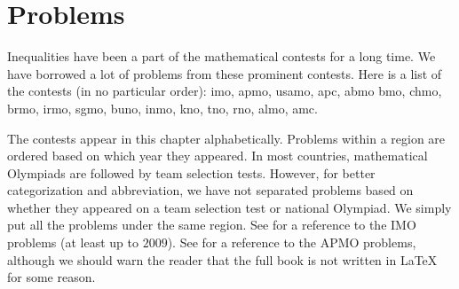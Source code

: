 \documentclass{subfile}
\begin{document}
	\chapter{Problems}\label{ch:problems}
	Inequalities have been a part of the mathematical contests for a long time. We have borrowed a lot of problems from these prominent contests. Here is a list of the contests (in no particular order): \Gls{imo}, \Gls{apmo}, \Gls{usamo}, \Gls{apc}, \Gls{abmo} \Gls{bmo}, \Gls{chmo}, \Gls{brmo}, \Gls{irmo}, \Gls{sgmo}, \Gls{buno}, \Gls{inmo}, \Gls{kno}, \Gls{tno}, \Gls{rno}, \Gls{almo}, \Gls{amc}.
	
	The contests appear in this chapter alphabetically. Problems within a region are ordered based on which year they appeared. In most countries, mathematical Olympiads are followed by team selection tests. However, for better categorization and abbreviation, we have not separated problems based on whether they appeared on a team selection test or national Olympiad. We simply put all the problems under the same region. See \textcite{djukicc_jankovic_matic_2011} for a reference to the IMO problems (at least up to $2009$). See \textcite{dongphd_suugaku_2009} for a reference to the APMO problems, although we should warn the reader that the full book is not written in \LaTeX{} for some reason.
\end{document}
